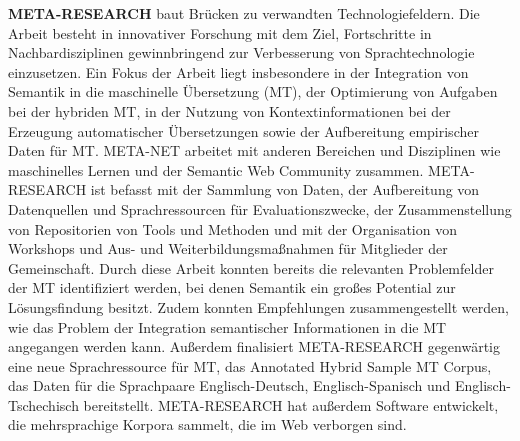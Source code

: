 \documentclass[]{../../metanetpaper}
\begin{document}
\begin{Parallel}[c]{79mm}{78mm}
{\textbf{META-RESEARCH} baut Brücken zu verwandten Technologiefeldern. Die Arbeit besteht in innovativer Forschung mit dem Ziel, Fortschritte in Nachbardisziplinen gewinnbringend zur Verbesserung von Sprachtechnologie einzusetzen. Ein Fokus der Arbeit liegt insbesondere in der Integration von Semantik in die maschinelle Übersetzung (MT), der Optimierung von Aufgaben bei der hybriden MT, in der Nutzung von Kontextinformationen bei der Erzeugung automatischer Übersetzungen sowie der Aufbereitung empirischer Daten für MT. META-NET arbeitet mit anderen Bereichen und Disziplinen wie maschinelles Lernen und der Semantic Web Community zusammen. META-RESEARCH ist befasst mit der Sammlung von Daten, der Aufbereitung von Datenquellen und Sprachressourcen für Evaluationszwecke, der Zusammenstellung von Repositorien von Tools und Methoden und mit der Organisation von Workshops und Aus- und Weiterbildungsmaßnahmen für Mitglieder der Gemeinschaft. Durch diese Arbeit konnten bereits die relevanten Problemfelder der MT identifiziert werden, bei denen Semantik ein großes Potential zur Lösungsfindung besitzt. Zudem konnten Empfehlungen zusammengestellt werden, wie das Problem der Integration semantischer Informationen in die MT angegangen werden kann. Außerdem finalisiert META-RESEARCH gegenwärtig eine neue Sprachressource für MT, das Annotated Hybrid Sample MT Corpus, das Daten für die Sprachpaare Englisch-Deutsch, Englisch-Spanisch und Englisch-Tschechisch bereitstellt. META-RESEARCH hat außerdem Software entwickelt, die mehrsprachige Korpora sammelt, die im Web verborgen sind.
  }

\end{Parallel}
\end{document}
